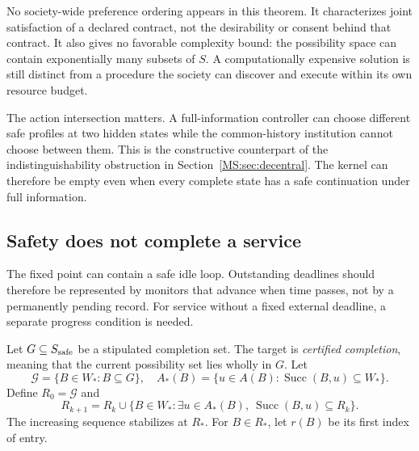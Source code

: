 No society-wide preference ordering appears in this theorem. It characterizes joint satisfaction of a declared contract, not the desirability or consent behind that contract. It also gives no favorable complexity bound: the possibility space can contain exponentially many subsets of $S$. A computationally expensive solution is still distinct from a procedure the society can discover and execute within its own resource budget.

The action intersection matters. A full-information controller can choose different safe profiles at two hidden states while the common-history institution cannot choose between them. This is the constructive counterpart of the indistinguishability obstruction in Section~\ref{MS:sec:decentral}. The kernel can therefore be empty even when every complete state has a safe continuation under full information.

\subsection{Safety does not complete a service}
The fixed point can contain a safe idle loop. Outstanding deadlines should therefore be represented by monitors that advance when time passes, not by a permanently pending record. For service without a fixed external deadline, a separate progress condition is needed.

Let $G\subseteq S_{\rm safe}$ be a stipulated completion set. The target is \emph{certified completion}, meaning that the current possibility set lies wholly in $G$. Let
\[
\mathcal G=\{B\in W_*:B\subseteq G\},
\quad
A_*(B)=\{u\in A(B):\operatorname{Succ}(B,u)\subseteq W_*\}.
\]
Define $R_0=\mathcal G$ and
\begin{equation}\label{MS:eq:progress-attractor}
R_{k+1}=R_k\cup
\{B\in W_*:\exists u\in A_*(B),\
\operatorname{Succ}(B,u)\subseteq R_k\}.
\end{equation}
The increasing sequence stabilizes at $R_*$. For $B\in R_*$, let $r(B)$ be its first index of entry.

